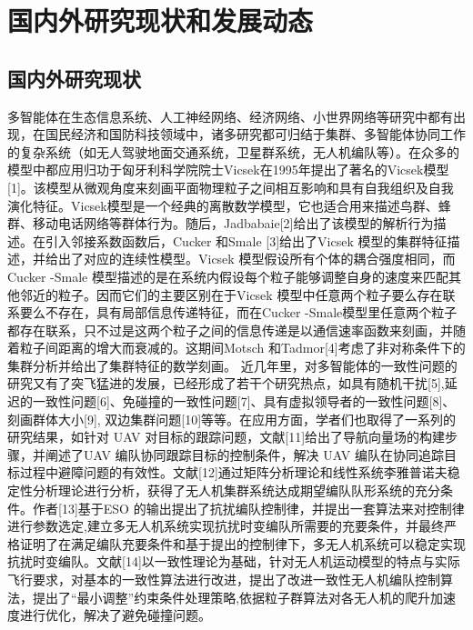 
\section{国内外研究现状和发展动态}

\subsection{国内外研究现状}

多智能体在生态信息系统、人工神经网络、经济网络、小世界网络等研究中都有出现，在国民经济和国防科技领域中，诸多研究都可归结于集群、多智能体协同工作的复杂系统（如无人驾驶地面交通系统，卫星群系统，无人机编队等）。在众多的模型中都应用归功于匈牙利科学院院士Vicsek在1995年提出了著名的Vicsek模型[1]。该模型从微观角度来刻画平面物理粒子之间相互影响和具有自我组织及自我演化特征。Vicsek模型是一个经典的离散数学模型，它也适合用来描述鸟群、蜂群、移动电话网络等群体行为。随后，Jadbabaie[2]给出了该模型的解析行为描述。在引入邻接系数函数后，Cucker 和Smale [3]给出了Vicsek 模型的集群特征描述，并给出了对应的连续性模型。Vicsek 模型假设所有个体的耦合强度相同，而Cucker -Smale 模型描述的是在系统内假设每个粒子能够调整自身的速度来匹配其他邻近的粒子。因而它们的主要区别在于Vicsek 模型中任意两个粒子要么存在联系要么不存在，具有局部信息传递特征，而在Cucker -Smale模型里任意两个粒子都存在联系，只不过是这两个粒子之间的信息传递是以通信速率函数来刻画，并随着粒子间距离的增大而衰减的。这期间Motsch 和Tadmor[4]考虑了非对称条件下的集群分析并给出了集群特征的数学刻画。 近几年里，对多智能体的一致性问题的研究又有了突飞猛进的发展，已经形成了若干个研究热点，如具有随机干扰[5],延迟的一致性问题[6]、免碰撞的一致性问题[7]、具有虚拟领导者的一致性问题[8]、刻画群体大小[9], 双边集群问题[10]等等。在应用方面，学者们也取得了一系列的研究结果，如针对 UAV 对目标的跟踪问题，文献[11]给出了导航向量场的构建步骤，并阐述了UAV 编队协同跟踪目标的控制条件，解决 UAV 编队在协同追踪目标过程中避障问题的有效性。文献[12]通过矩阵分析理论和线性系统李雅普诺夫稳定性分析理论进行分析，获得了无人机集群系统达成期望编队队形系统的充分条件。作者[13]基于ESO 的输出提出了抗扰编队控制律，并提出一套算法来对控制律进行参数选定,建立多无人机系统实现抗扰时变编队所需要的充要条件，并最终严格证明了在满足编队充要条件和基于提出的控制律下，多无人机系统可以稳定实现抗扰时变编队。文献[14]以一致性理论为基础，针对无人机运动模型的特点与实际飞行要求，对基本的一致性算法进行改进，提出了改进一致性无人机编队控制算法，提出了“最小调整”约束条件处理策略,依据粒子群算法对各无人机的爬升加速度进行优化，解决了避免碰撞问题。


